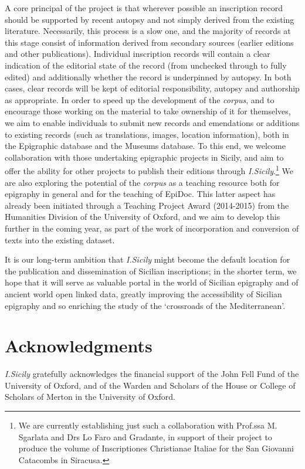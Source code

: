 \documentclass[amsthm,ebook]{saparticle}
\begin{document}
A core principal of the project is that wherever possible an inscription record should be supported by recent autopsy
and not simply derived from the existing literature. Necessarily, this process is a slow one, and the majority of
records at this stage consist of information derived from secondary sources (earlier editions and other publications).
Individual inscription records will contain a clear indication of the editorial state of the record (from unchecked
through to fully edited) and additionally whether the record is underpinned by autopsy. In both cases, clear records
will be kept of editorial responsibility, autopsy and authorship as appropriate. In order to speed up the development
of the \emph{corpus}, and to encourage those working on the material to take ownership of it for themselves, we aim to enable
individuals to submit new records and emendations or additions to existing records (such as translations, images,
location information), both in the Epigraphic database and the Museums database. To this end, we welcome collaboration
with those undertaking epigraphic projects in Sicily, and aim to offer the ability for other projects to publish their
editions through \emph{I.Sicily}.\footnote{ We are currently establishing just such a collaboration with Prof.ssa M. Sgarlata
and Drs Lo Faro and Gradante, in support of their project to produce the volume of Inscriptiones Christianae Italiae
for the San Giovanni Catacombs in Siracusa.} We are also exploring the potential of the \emph{corpus} as a teaching resource
both for epigraphy in general and for the teaching of EpiDoc. This latter aspect has already been initiated through a
Teaching Project Award (2014-2015) from the Humanities Division of the University of Oxford, and we aim to develop this
further in the coming year, as part of the work of incorporation and conversion of texts into the existing dataset.

It is our long-term ambition that \emph{I.Sicily} might become the default location for the publication and dissemination of
Sicilian inscriptions; in the shorter term, we hope that it will serve as valuable portal in the world of Sicilian
epigraphy and of ancient world open linked data, greatly improving the accessibility of Sicilian epigraphy and so
enriching the study of the `crossroads of the Mediterranean’.




\section*{Acknowledgments}

\noindent \emph{I.Sicily} gratefully acknowledges the financial support of the John Fell Fund of the
University of Oxford, and of the Warden and Scholars of the House or College of Scholars of Merton in the University of
Oxford.




\end{document}
